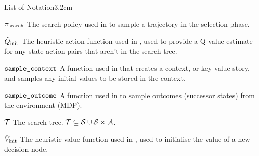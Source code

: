 \begin{mclistof}{List of Notation}{3.2cm}
    \item[${\pi_{\textnormal{search}}}$]
        The search policy used in \thtspp\ewe to sample a trajectory in the selection phase.
    \item[${\hat{Q}_{\textnormal{init}}}$]
        The heuristic action function used in \thtspp, used to provide a Q-value estimate for any state-action pairs that aren't in the search tree.
    \item[${\textnormal{\texttt{sample\_context}}}$]
        A function used in \thtspp\ewe that creates a context, or key-value story, and samples any initial values to be stored in the context.
    \item[${\textnormal{\texttt{sample\_outcome}}}$]
        A function used in \thtspp\ewe to sample outcomes (successor states) from the environment (MDP).
    \item[$\mathcal{T}$] 
        The \thtspp\ewe search tree. $\mathcal{T}\subseteq \mathcal{S} \cup \mathcal{S}\times\mathcal{A}$. 
    \item[${\hat{V}_{\textnormal{init}}}$]
        The heuristic value function used in \thtspp, used to initialise the value of a new decision node. 

\end{mclistof}
